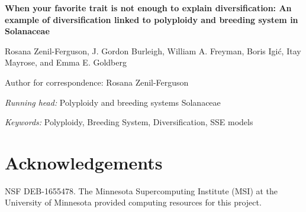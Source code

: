 \documentclass[11pt]{article}
\begin{document}

\begin{center}
    \textbf{When your favorite trait is not enough to explain diversification: An example of diversification linked to polyploidy and breeding system in Solanaceae}
\end{center}

\vfill

\noindent
Rosana Zenil-Ferguson,%
%
\noindent
J. Gordon Burleigh,%
%
\noindent
William A. Freyman,%
%
\noindent
Boris Igi\'c,%
%
\noindent
Itay Mayrose,%
%
and
Emma E. Goldberg%

\vfill

\theendnotes

\noindent
Author for correspondence: Rosana Zenil-Ferguson

\vfill

\noindent
\textit{Running head:} Polyploidy and breeding systems Solanaceae

\vfill

\noindent
\textit{Keywords:} 
Polyploidy,
Breeding System,
Diversification, SSE models

\vfill

\linenumbers


\clearpage



\clearpage





\section{Acknowledgements}

NSF DEB-1655478.
The Minnesota Supercomputing Institute (MSI) at the University of Minnesota provided computing resources for this project.


\clearpage


\setstretch{\stretchby}

\end{document}
